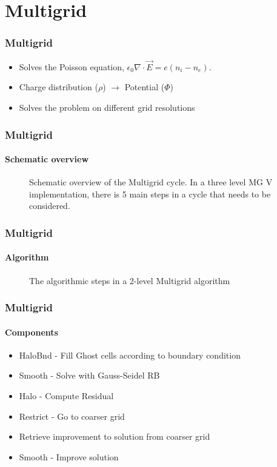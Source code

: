 \documentclass{beamer}
\begin{document}
\section{Multigrid} %
\label{sub:ssec2}%
\begin{frame}
	\frametitle{Multigrid}
	\begin{itemize}
		\item Solves the Poisson equation, \(\epsilon_0 \nabla \cdot \vec{E} = e(n_i-n_e)\).
		\item Charge distribution (\(\rho\)) \(\longrightarrow\) Potential (\(\Phi\))
		\item Solves the problem on different grid resolutions
	\end{itemize}
\end{frame}

\begin{frame}
	\frametitle{Multigrid}
	\framesubtitle{Schematic overview}
	\begin{figure}
		\center
		\resizebox{10.cm}{6.cm}{
			
		}
		\caption{Schematic overview of the Multigrid cycle. In a three level MG V implementation,
			there is 5 main steps in a cycle that needs to be considered.}
	\end{figure}
\end{frame}

\begin{frame}
	\frametitle{Multigrid}
	\framesubtitle{Algorithm}
	\begin{figure}
	\center
	\resizebox{10.cm}{6.cm}{
	 }
	\caption{The algorithmic steps in a 2-level Multigrid algorithm}
	\end{figure}
\end{frame}

\begin{frame}
	\frametitle{Multigrid}
	\framesubtitle{Components}
	\begin{itemize}
		\item HaloBnd - Fill Ghost cells according to boundary condition
		\item Smooth - Solve with Gauss-Seidel RB
		\item Halo - Compute Residual
		\item Restrict - Go to coarser grid
		\item Retrieve improvement to solution from coarser grid
		\item Smooth - Improve solution
	\end{itemize}
\end{frame}
\end{document}
